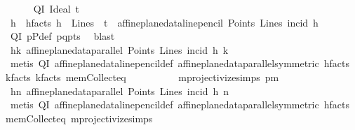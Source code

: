 \begin{isabellebody}
\ \ \ \ \isamarkupfalse%
\ QI{\isacharcolon}{\kern0pt}\ {\isacharparenleft}{\kern0pt}Ideal\ t{\isacharparenright}{\kern0pt}\isanewline
\ \ \ \ \isamarkupfalse%
\ h\ \ h{\isacharunderscore}{\kern0pt}facts{\isacharcolon}{\kern0pt}\ {\isachardoublequoteopen}h\ {\isasymin}\ Lines\ {\isasymand}\ t\ {\isacharequal}{\kern0pt}\ affine{\isacharunderscore}{\kern0pt}plane{\isacharunderscore}{\kern0pt}data{\isachardot}{\kern0pt}line{\isacharunderscore}{\kern0pt}pencil\ Points\ Lines\ {\isacharparenleft}{\kern0pt}incid{\isacharparenright}{\kern0pt}\ h{\isachardoublequoteclose}\ \ \isamarkupfalse%
\ QI\ pPdef\ pq{\isacharunderscore}{\kern0pt}pts\ \isamarkupfalse%
\ blast\isanewline
\ \ \ \ \isamarkupfalse%
\ hk{}{\isacharcolon}{\kern0pt}\ {\isachardoublequoteopen}affine{\isacharunderscore}{\kern0pt}plane{\isacharunderscore}{\kern0pt}data{\isachardot}{\kern0pt}parallel\ Points\ Lines\ {\isacharparenleft}{\kern0pt}incid{\isacharparenright}{\kern0pt}\ h\ k{}{\isachardoublequoteclose}\isanewline
\ \ \ \ \ \ \isamarkupfalse%
\ {\isacharparenleft}{\kern0pt}metis\ QI\ affine{\isacharunderscore}{\kern0pt}plane{\isacharunderscore}{\kern0pt}data{\isachardot}{\kern0pt}line{\isacharunderscore}{\kern0pt}pencil{\isacharunderscore}{\kern0pt}def\ affine{\isacharunderscore}{\kern0pt}plane{\isacharunderscore}{\kern0pt}data{\isachardot}{\kern0pt}parallel{\isacharunderscore}{\kern0pt}symmetric\ h{\isacharunderscore}{\kern0pt}facts\ k{}{\isacharunderscore}{\kern0pt}facts\ k{\isacharunderscore}{\kern0pt}facts\ mem{\isacharunderscore}{\kern0pt}Collect{\isacharunderscore}{\kern0pt}eq\isanewline
\ \ \ \ \ \ \ \ \ \ mprojectivize{\isachardot}{\kern0pt}simps{\isacharparenleft}{\kern0pt}{}{\isacharparenright}{\kern0pt}\ pm{\isacharparenright}{\kern0pt}\isanewline
\ \ \ \ \isamarkupfalse%
\ hn{}{\isacharcolon}{\kern0pt}\ {\isachardoublequoteopen}affine{\isacharunderscore}{\kern0pt}plane{\isacharunderscore}{\kern0pt}data{\isachardot}{\kern0pt}parallel\ Points\ Lines\ {\isacharparenleft}{\kern0pt}incid{\isacharparenright}{\kern0pt}\ h\ n{}{\isachardoublequoteclose}\isanewline
\ \ \ \ \ \ \isamarkupfalse%
\ {\isacharparenleft}{\kern0pt}metis\ QI\ affine{\isacharunderscore}{\kern0pt}plane{\isacharunderscore}{\kern0pt}data{\isachardot}{\kern0pt}line{\isacharunderscore}{\kern0pt}pencil{\isacharunderscore}{\kern0pt}def\ affine{\isacharunderscore}{\kern0pt}plane{\isacharunderscore}{\kern0pt}data{\isachardot}{\kern0pt}parallel{\isacharunderscore}{\kern0pt}symmetric\ h{\isacharunderscore}{\kern0pt}facts\ mem{\isacharunderscore}{\kern0pt}Collect{\isacharunderscore}{\kern0pt}eq\ mprojectivize{\isachardot}{\kern0pt}simps{\isacharparenleft}{\kern0pt}{}{\isacharparenright}{\kern0pt}\isanewline

\end{isabellebody}
